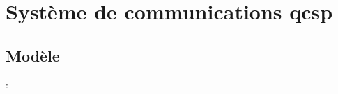 \documentclass[../main.tex]{subfiles}
\begin{document}
\section[Système de communications QCSP]{Système de communications \acrshort{qcsp}}


\subsection{Modèle}

\begin{frame}{\secname : \subsecname}
  \begin{overlayarea}{\linewidth}{0.3\textheight}
    \resizebox{\linewidth}{!}{
      
    }
  \end{overlayarea}

  \vspace{1 em}


\end{frame}
\end{document}
